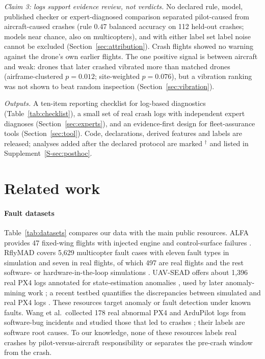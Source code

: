 \documentclass[preprint,12pt]{elsarticle}
\begin{document}
\emph{Claim 3: logs support evidence review, not verdicts.} No declared rule, model, published checker or expert-diagnosed comparison separated pilot-caused from aircraft-caused crashes (rule 0.47 balanced accuracy on 112 held-out crashes; models near chance, also on multicopters), and with either label set label noise cannot be excluded (Section~\ref{sec:attribution}). Crash flights showed no warning against the drone's own earlier flights. The one positive signal is between aircraft and weak: drones that later crashed vibrated more than matched drones (airframe-clustered $p=0.012$; site-weighted $p=0.076$), but a vibration ranking was not shown to beat random inspection (Section~\ref{sec:vibration}).

\emph{Outputs.} A ten-item reporting checklist for log-based diagnostics (Table~\ref{tab:checklist}), a small set of real crash logs with independent expert diagnoses (Section~\ref{sec:experts}), and an evidence-first design for fleet-assurance tools (Section~\ref{sec:tool}). Code, declarations, derived features and labels are released; analyses added after the declared protocol are marked $^\dagger$ and listed in Supplement~\ref{S-sec:posthoc}.

\section{Related work}
\label{sec:related}

\paragraph{Fault datasets} Table~\ref{tab:datasets} compares our data with the main public resources. ALFA provides
47 fixed-wing flights with injected engine and control-surface failures \cite{keipour2021alfa}. RflyMAD covers 5,629
multicopter fault cases with eleven fault types in simulation and seven in real flights, of which 497 are real flights and the rest software- or
hardware-in-the-loop simulations \cite{le2025rflymad}. UAV-SEAD offers about 1,396 real PX4 logs annotated for
state-estimation anomalies \cite{kabaoglu2026uavsead}, used by later anomaly-mining work \cite{wei2026aerotsboost};
a recent testbed quantifies the discrepancies between simulated and real PX4 logs \cite{kose2026testbed}. These
resources target anomaly or fault detection under known faults. Wang et al.\ collected 178 real abnormal PX4 and ArduPilot logs from software-bug incidents and studied those that led to crashes \cite{wang2024loganomaly}; their labels are software root causes. To our knowledge, none of these resources labels real crashes by pilot-versus-aircraft responsibility or separates the pre-crash window from the crash.
\end{document}
